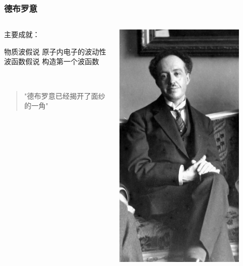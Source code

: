 \begin{frame}
    \frametitle{德布罗意}
        \begin{columns}
            \begin{column}[t]{0.46\linewidth}
                主要成就：\\
                \begin{enumerate}
                    \Item 物质波假说
                    \Item 原子内电子的波动性
                    \Item 波函数假说 
                    \Item 构造第一个波函数
                \end{enumerate}
                ~\\
                \begin{quote}
                "德布罗意已经揭开了面纱的一角"  \\
                \end{quote}  
            \end{column}
            \begin{column}[t]{0.46\linewidth}
                \begin{center}
                    \includegraphics[width=0.85\textwidth]{figs/2021-12-03-18-00-05.png} \\

\end{center}
\end{column}
\end{columns}
\end{frame}
